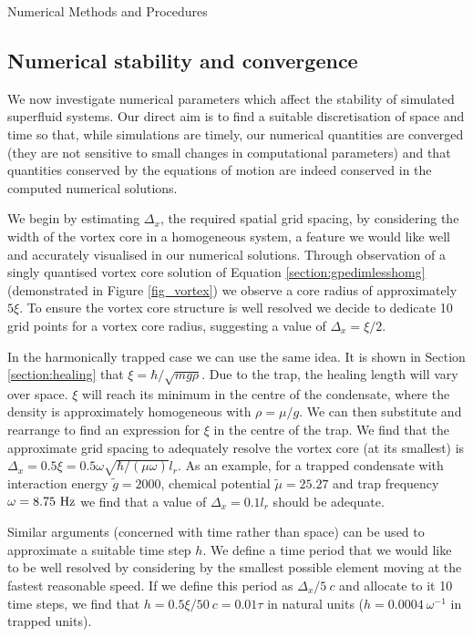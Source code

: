 \begin{chapter}{\label{cha:numerics}Numerical Methods and Procedures}
	\subsection{\label{section:numericalParams} Numerical stability and convergence}
	We now investigate numerical parameters which affect the stability of simulated superfluid systems. Our direct aim is to find a suitable discretisation of space and time so that, while simulations are timely, our numerical quantities are converged (they are not sensitive to small changes in computational parameters) and that quantities conserved by the equations of motion are indeed conserved in the computed numerical solutions.

	We begin by estimating $\Delta_x$, the required spatial grid spacing, by considering the width of the vortex core in a homogeneous system, a feature we would like well and accurately visualised in our numerical solutions. Through observation of a singly quantised vortex core solution of Equation \ref{section:gpedimlesshomg} (demonstrated in Figure \ref{fig_vortex}) we observe a core radius of approximately $5\xi$. To ensure the vortex core structure is well resolved we decide to dedicate 10 grid points for a vortex core radius, suggesting a value of $\Delta_x = \xi/2$.

	In the harmonically trapped case we can use the same idea. It is shown in Section \ref{section:healing} that $\xi = \hbar/\sqrt{mg\rho}$. Due to the trap, the healing length will vary over space. $\xi$ will reach its minimum in the centre of the condensate, where the density is approximately homogeneous with $\rho=\mu/g$. We can then substitute and rearrange to find an expression for $\xi$ in the centre of the trap. We find that the approximate grid spacing to adequately resolve the vortex core (at its smallest) is $\Delta_x = 0.5\xi = 0.5\omega \sqrt{\hbar/(\mu \omega)} l_r$. As an example, for a trapped condensate with interaction energy $\tilde{g}=2000$, chemical potential $\tilde{\mu}=25.27$ and trap frequency $\omega=8.75~{\rm Hz}$ we find that a value of $\Delta_x=0.1l_r$ should be adequate.

	Similar arguments (concerned with time rather than space) can be used to approximate a suitable time step $h$. We define a time period that we would like to be well resolved by considering by the smallest possible element moving at the fastest reasonable speed. If we define this period as $\Delta_x / 5~c$ and allocate to it 10 time steps, we find that $h = 0.5\xi/50~c = 0.01\tau$ in natural units ($h=0.0004~\omega^{-1}$ in trapped units).


\end{chapter}

